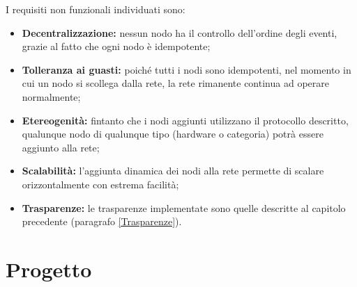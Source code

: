\documentclass{memoir}
\begin{document}
I requisiti non funzionali individuati sono:
\begin{itemize}
\item \textbf{Decentralizzazione:} nessun nodo ha il controllo dell'ordine degli
	   eventi, grazie al fatto che ogni nodo è idempotente;
\item \textbf{Tolleranza ai guasti:} poiché tutti i nodi sono idempotenti, nel momento
	   in cui un nodo si scollega dalla rete, la rete rimanente continua ad operare
	   normalmente;
\item \textbf{Etereogenità:} fintanto che i nodi aggiunti utilizzano il protocollo
	   descritto, qualunque nodo di qualunque tipo (hardware o categoria) potrà essere
	   aggiunto alla rete;
\item \textbf{Scalabilità:} l'aggiunta dinamica dei nodi alla rete permette di scalare
	   orizzontalmente con estrema facilità;
\item \textbf{Trasparenze:} le trasparenze implementate sono quelle descritte al
	   capitolo precedente (paragrafo \ref{Trasparenze}).
\end{itemize}

%
%
%
%
%



\chapter{Progetto}\label{ch:progetto}
\end{document}
